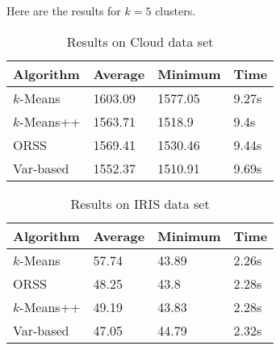 \documentclass[twoside, 11pt]{article}
\begin{document}
	Here are the results for $k=5$ clusters.
		\begin{table}
			\begin{center}
				\begin{tabular}{|l|l|l|l|}
					\hline
					Algorithm & Average & Minimum & Time\\\hline
					$k$-Means & 1603.09& 1577.05& 9.27s\\\hline
					$k$-Means++ & 1563.71& 1518.9& 9.4s\\\hline
					ORSS & 1569.41& 1530.46& 9.44s\\\hline
					Var-based & 1552.37& 1510.91& 9.69s\\\hline
				\end{tabular}
			\caption{Results on Cloud data set}
			\end{center}
		\label{tbl:cloud}
		\end{table}
	
		\begin{table}
			\begin{center}
				\begin{tabular}{|l|l|l|l|}
					\hline
					Algorithm & Average & Minimum & Time\\\hline
					$k$-Means & 57.74& 43.89& 2.26s\\\hline
					ORSS & 48.25& 43.8& 2.28s\\\hline
					$k$-Means++ & 49.19& 43.83& 2.28s\\\hline
					Var-based & 47.05& 44.79& 2.32s\\\hline
				\end{tabular}
				\caption{Results on IRIS data set}
			\end{center}
			\label{tbl:iris}
		\end{table}
\end{document}
